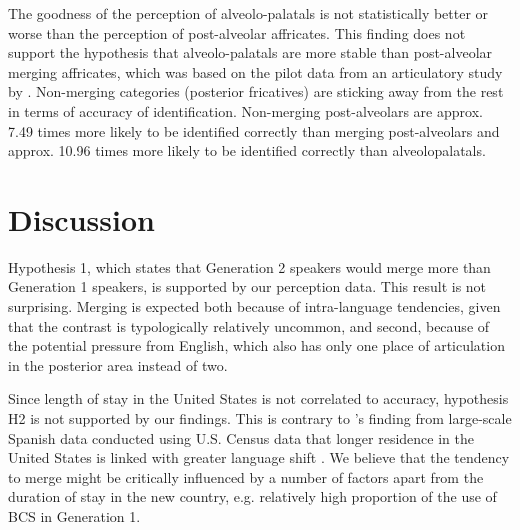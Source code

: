 \documentclass[output=paper,
modfonts,
newtxmath,
hidelinks,
]{langscibook}
\begin{document}
The goodness of the perception of alveolo-palatals is not statistically better or worse than the perception of post-alveolar affricates. This finding does not support the hypothesis that alveolo-palatals are more stable than post-alveolar merging affricates, which was based on the pilot data from an articulatory study by \citet{Cavar-etal2016}. Non-merging categories (posterior fricatives) are sticking away from the rest in terms of accuracy of identification. Non-merging post-alveolars are approx. 7.49 times more likely to be identified correctly than merging post-alveolars and approx. 10.96 times more likely to be identified correctly than alveolopalatals.



\section{Discussion}\label{sec:mihajlovic:6}

Hypothesis 1, which states that Generation 2 speakers would merge more than Generation 1 speakers, is supported by our perception data. This result is not surprising. Merging is expected both because of intra-language tendencies, given that the contrast is typologically relatively uncommon, and second, because of the potential pressure from English, which also has only one place of articulation in the posterior area instead of two.



Since length of stay in the United States is not correlated to accuracy, hypothesis H2 is not supported by our findings. This is contrary to \citeauthor{Veltman2000}’s finding from large-scale Spanish data conducted using U.S. Census data that longer residence in the United States is linked with greater language shift \citep[66]{Veltman2000}. We believe that the tendency to merge might be critically influenced by a number of factors apart from the duration of stay in the new country, e.g. relatively high proportion of the use of BCS in Generation 1.
\end{document}
